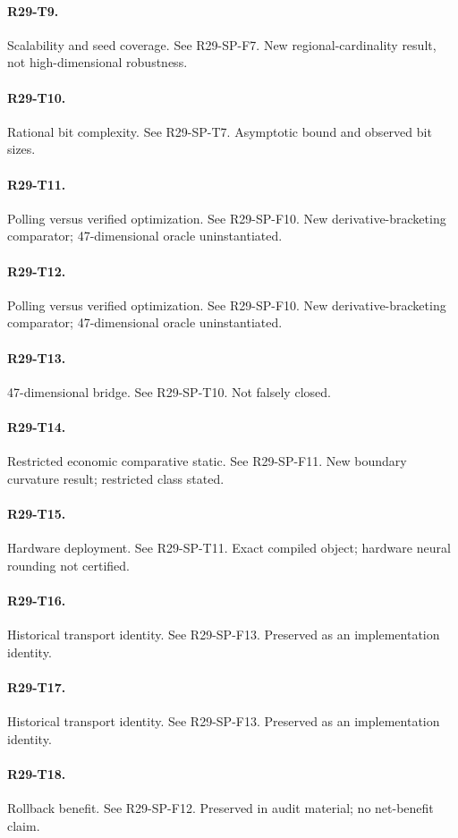 \paragraph{R29-T9.} Scalability and seed coverage. See R29-SP-F7. New regional-cardinality result, not high-dimensional robustness.
\paragraph{R29-T10.} Rational bit complexity. See R29-SP-T7. Asymptotic bound and observed bit sizes.
\paragraph{R29-T11.} Polling versus verified optimization. See R29-SP-F10. New derivative-bracketing comparator; 47-dimensional oracle uninstantiated.
\paragraph{R29-T12.} Polling versus verified optimization. See R29-SP-F10. New derivative-bracketing comparator; 47-dimensional oracle uninstantiated.
\paragraph{R29-T13.} 47-dimensional bridge. See R29-SP-T10. Not falsely closed.
\paragraph{R29-T14.} Restricted economic comparative static. See R29-SP-F11. New boundary curvature result; restricted class stated.
\paragraph{R29-T15.} Hardware deployment. See R29-SP-T11. Exact compiled object; hardware neural rounding not certified.
\paragraph{R29-T16.} Historical transport identity. See R29-SP-F13. Preserved as an implementation identity.
\paragraph{R29-T17.} Historical transport identity. See R29-SP-F13. Preserved as an implementation identity.
\paragraph{R29-T18.} Rollback benefit. See R29-SP-F12. Preserved in audit material; no net-benefit claim.
